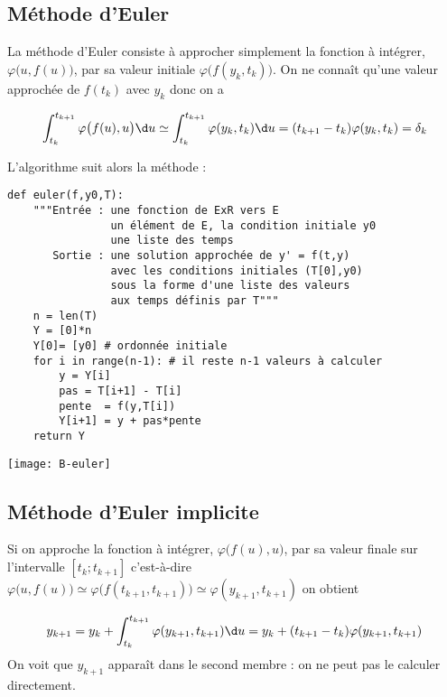 \subsection{Méthode d'Euler}
La méthode d'Euler consiste à approcher simplement la fonction à intégrer, $\varphi\bigl(u,f(u)\bigr)$, par sa valeur initiale  $\varphi\bigl(f(y_k,t_k)\bigr)$. On ne connaît qu'une valeur approchée de $f(t_k)$ avec $y_k$ donc on a 

\[\int_{t_{k}}^{t_{k+1}}\varphi\bigl(f(u),u\bigr) \d u 
\simeq \int_{t_{k}}^{t_{k+1}}\varphi(y_k,t_k) \d u
=(t_{k+1}-t_k) \varphi(y_k,t_k) = \delta_k\]

L'algorithme suit alors la méthode :
\begin{lstlisting}
def euler(f,y0,T):
    """Entrée : une fonction de ExR vers E 
                un élément de E, la condition initiale y0
                une liste des temps
       Sortie : une solution approchée de y' = f(t,y)
                avec les conditions initiales (T[0],y0)
                sous la forme d'une liste des valeurs
                aux temps définis par T"""
    n = len(T)
    Y = [0]*n
    Y[0]= [y0] # ordonnée initiale
    for i in range(n-1): # il reste n-1 valeurs à calculer
        y = Y[i]
        pas = T[i+1] - T[i]
        pente  = f(y,T[i]) 
        Y[i+1] = y + pas*pente      
    return Y
\end{lstlisting}
\begin{center}
\texttt{[image: B-euler]}
\end{center}
\subsection{Méthode d'Euler implicite}
Si on approche la fonction à intégrer, $\varphi\bigl(f(u),u\bigr)$, par sa valeur finale sur l'intervalle $[t_k;t_{k+1}]$ c'est-à-dire $\varphi\bigl(u,f(u)\bigr) \simeq \varphi\bigl(f(t_{k+1},t_{k+1})\bigr)\simeq \varphi(y_{k+1},t_{k+1})$ on obtient

\[y_{k+1} =  y_k+\int_{t_{k}}^{t_{k+1}}\varphi(y_{k+1},t_{k+1}) \d u  = y_k+ (t_{k+1}-t_k) \varphi(y_{k+1},t_{k+1})\]
On voit que $y_{k+1}$ apparaît dans le second membre : on ne peut pas le calculer directement.

